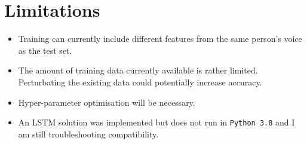 \documentclass[12pt]{article}
\begin{document}
\section{Limitations}
\begin{itemize}
\item Training can currently include different features from the same person's voice as the test set.
\item The amount of training data currently available is rather limited. Perturbating the existing data could potentially increase accuracy.
\item Hyper-parameter optimisation will be necessary.
\item An LSTM solution was implemented but does not run in \texttt{Python 3.8} and I am still troubleshooting compatibility.

\end{itemize}
\end{document}
